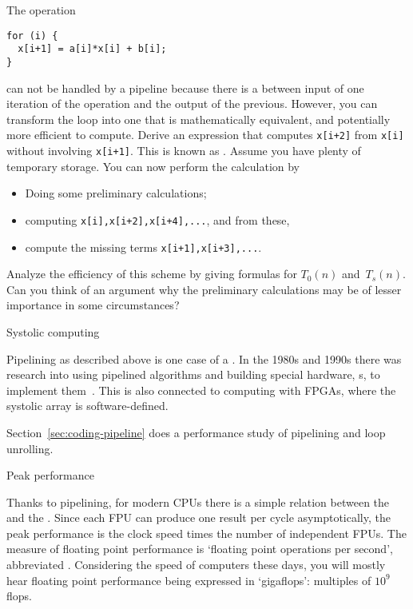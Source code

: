 \begin{exercise}
\label{ex:recursivedoubling}
  The operation
\begin{lstlisting}
for (i) {
  x[i+1] = a[i]*x[i] + b[i];
}
\end{lstlisting}
  can not be handled by a pipeline because there is
  a  between input of one iteration of the operation
  and the output of the previous.
  However, you can transform the loop into one that is mathematically
  equivalent, and potentially more efficient to compute. Derive an
  expression that computes \texttt{x[i+2]} from \texttt{x[i]} without
  involving \texttt{x[i+1]}. This is known as . Assume you have plenty of temporary storage. You can now
  perform the calculation by
  \begin{itemize}
  \item Doing some preliminary calculations;
  \item computing \texttt{x[i],x[i+2],x[i+4],...}, and from these,
  \item compute the missing terms \texttt{x[i+1],x[i+3],...}.
  \end{itemize}
  Analyze the efficiency of this scheme by giving formulas for
  $T_0(n)$ and~$T_s(n)$. Can you think of an argument
  why the preliminary calculations may be of lesser importance in some
  circumstances?
\end{exercise}

 {Systolic computing}

Pipelining as described above is one case of a
. In the 1980s and 1990s there was
research into using pipelined algorithms and building special
hardware, s, to implement
them~\cite{Ku:systolic}. This is also connected to computing with
\acp{FPGA}, where the systolic array is software-defined.

Section~\ref{sec:coding-pipeline} does a performance study
of pipelining and loop unrolling.


 {Peak performance}

Thanks to pipelining, for modern \acp{CPU} there is a simple relation
between the  and the .
Since each \ac{FPU} can produce one result per cycle
asymptotically, the peak performance is the clock speed times the
number of independent \acp{FPU}. The measure of floating
point performance is `floating point operations per second',
abbreviated . Considering the speed of computers
these days, you will mostly hear floating point performance being
expressed in `gigaflops': multiples of $10^9$ flops.

